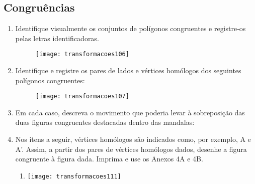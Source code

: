 \exercise

\subsection{Congruências}

\begin{enumerate}
\item Identifique visualmente os conjuntos de polígonos congruentes e registre-os pelas letras identificadoras. 
 
\begin{figure}[H]
\centering

\texttt{[image: transformacoes106]}
\end{figure}

\item Identifique e registre os pares de lados e vértices homólogos dos seguintes polígonos congruentes: 
 
\begin{figure}[H]
\centering

\texttt{[image: transformacoes107]}
\end{figure}

\item Em cada caso, descreva o movimento que poderia levar à sobreposição das duas figuras congruentes destacadas dentro das mandalas: 
\begin{enumerate}
\end{enumerate}
 

\item Nos itens a seguir, vértices homólogos são indicados como, por exemplo, A e A’. Assim, a partir dos pares de vértices homólogos dados, desenhe a figura congruente à figura dada. Imprima e use os Anexos 4A e 4B.
\begin{enumerate}
\item {}
{
\texttt{[image: transformacoes111]}
}
 

\end{enumerate}
\end{enumerate}
